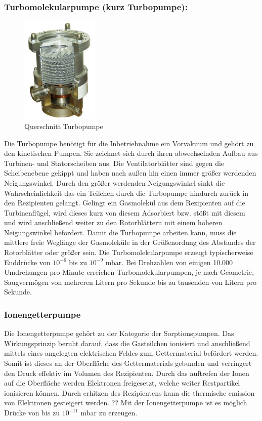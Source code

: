 \subsubsection{Turbomolekularpumpe (kurz Turbopumpe):}
\begin{figure}
    \vspace{-1cm}
    \centering
    \includegraphics[width=0.33\textwidth]{./picture/Turbo.jpg}
    \caption{Querschnitt Turbopumpe \cite{Turbo}}
    \label{fig:Turbo}
    \vspace{-0.5cm}
\end{figure}
Die Turbopumpe benötigt für die Inbetriebnahme ein Vorvakuum und gehört zu den kinetischen Pumpen. Sie zeichnet sich durch ihren abwechselnden Aufbau aus Turbinen-  und Statorscheiben aus. Die Ventilatorblätter sind gegen die Scheibenebene gekippt und haben nach außen hin einen immer größer werdenden Neigungswinkel. Durch den größer werdenden Neigungswinkel sinkt die Wahrscheinlichkeit das ein Teilchen durch die Turbopumpe hindurch zurück in den Rezipienten gelangt. Gelingt ein Gasmolekül aus dem Rezipienten auf die Turbinenflügel, wird dieses kurz von diesem Adsorbiert bzw. stößt mit diesem und wird anschließend weiter zu den Rotorblättern mit einem höheren Neigungswinkel befördert. Damit die Turbopumpe arbeiten kann, muss die mittlere freie Weglänge der Gasmoleküle in der Größenordung des Abstandes der Rotorblätter oder größer sein. Die Turbomolekularpumpe erzeugt typischerweise Enddrücke von $10^{-6}$ bis zu $10^{-9}$ mbar. Bei Drehzahlen von einigen 10.000 Umdrehungen pro Minute erreichen Turbomolekularpumpen, je nach Geometrie, Saugvermögen von mehreren Litern pro Sekunde bis zu tausenden von Litern pro Sekunde.

\subsubsection{Ionengetterpumpe}
Die Ionengetterpumpe gehört zu der Kategorie der Sorptionspumpen. Das Wirkungsprinzip beruht darauf, dass die Gasteilchen ionisiert und anschließend mittels eines angelegten elektrischen Feldes zum Gettermaterial befördert werden. Somit ist dieses an der Oberfläche des Gettermaterials gebunden und verringert den Druck effektiv im Volumen des Rezipienten. Durch das auftrefen der Ionen auf die Oberfläche werden Elektronen freigesetzt, welche weiter Restpartikel ionisieren können. Durch erhitzen des Rezipientens kann die thermische emission von Elektronen gesteigert werden. 
\newline
??
\newline
Mit der Ionengetterpumpe ist es möglich Drücke von bis zu $10^{-11}$ mbar zu erzeugen.
